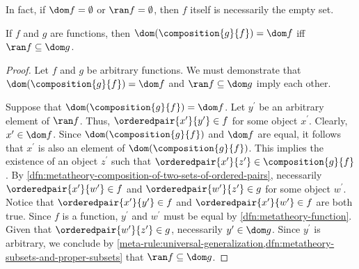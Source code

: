 \begin{rem}
    In fact, if \( \dom f = \emptyset \) or \( \ran f = \emptyset \), then \( f \) itself is necessarily the empty set.
\end{rem}

\begin{thm}
     \label{thm:metatheory-domain-of-g-compose-f-equals-domain-of-f-if-and-only-if-range-of-f-is-subset-of-domain-of-g}
    If \( f \) and \( g \) are functions, then \( \dom \mleft( \composition{g}{f} \mright) = \dom f \) iff \( \ran f \subseteq \dom g \).
\end{thm}

\begin{proof}
    Let \( f \) and \( g \) be arbitrary functions.
    We must demonstrate that \( \dom \mleft( \composition{g}{f} \mright) = \dom f \) and \( \ran f \subseteq \dom g \) imply each other.

    \vspace{0.3cm}
    \noindent
    Suppose that \( \dom \mleft( \composition{g}{f} \mright) = \dom f \).
    Let \( y^{\prime} \) be an arbitrary element of \( \ran f \).
    Thus, \( \orderedpair{x^{\prime}}{y^{\prime}} \in f \) for some object \( x^{\prime} \).
    Clearly, \( x^{\prime} \in \dom f \).
    Since \( \dom \mleft( \composition{g}{f} \mright) \) and \( \dom f \) are equal, it follows that
    \( x^{\prime} \) is also an element of \( \dom \mleft( \composition{g}{f} \mright) \).
    This implies the existence of an object \( z^{\prime} \) such that \( \orderedpair{x^{\prime}}{z^{\prime}} \in \composition{g}{f} \).
    By \cref{dfn:metatheory-composition-of-two-sets-of-ordered-pairs}, necessarily 
    \( \orderedpair{x^{\prime}}{w^{\prime}} \in f \) and \( \orderedpair{w^{\prime}}{z^{\prime}} \in g \) for some object \( w^{\prime} \).
    Notice that \( \orderedpair{x^{\prime}}{y^{\prime}} \in f \) and \( \orderedpair{x^{\prime}}{w^{\prime}} \in f \) are both true.
    Since \( f \) is a function, \( y^{\prime} \) and \( w^{\prime} \) must be equal by \cref{dfn:metatheory-function}.
    Given that \( \orderedpair{w^{\prime}}{z^{\prime}} \in g \), necessarily \( y^{\prime} \in \dom g \).
    Since \( y^{\prime} \) is arbitrary, we conclude by \cref{meta-rule:universal-generalization,dfn:metatheory-subsets-and-proper-subsets} that \( \ran f \subseteq \dom g \).


\end{proof}
